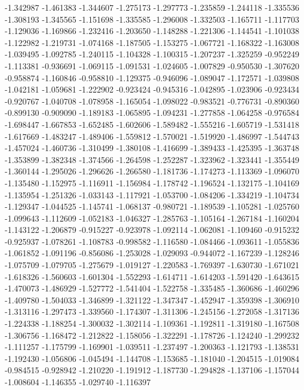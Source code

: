 -1.342987
-1.461383
-1.344607
-1.275173
-1.297773
-1.235859
-1.244118
-1.335536
-1.308193
-1.345565
-1.151698
-1.335585
-1.296008
-1.332503
-1.165711
-1.117703
-1.129036
-1.169866
-1.232416
-1.203650
-1.148288
-1.221306
-1.144541
-1.101038
-1.122982
-1.219731
-1.074168
-1.187505
-1.153275
-1.067721
-1.168322
-1.163008
-1.039495
-1.092785
-1.240115
-1.104328
-1.100315
-1.207237
-1.325259
-0.952249
-1.113381
-0.936691
-1.069115
-1.091531
-1.024605
-1.007829
-0.950530
-1.307620
-0.958874
-1.160846
-0.958810
-1.129375
-0.946096
-1.089047
-1.172571
-1.039808
-1.042181
-1.059681
-1.222902
-0.923424
-0.945316
-1.042895
-1.023906
-0.923434
-0.920767
-1.040708
-1.078958
-1.165054
-1.098022
-0.983521
-0.776731
-0.890360
-0.899130
-0.909090
-1.189183
-1.065895
-1.094231
-1.277858
-1.064258
-0.976584
-1.698447
-1.667853
-1.652485
-1.602606
-1.589482
-1.555216
-1.605719
-1.531418
-1.617669
-1.483247
-1.489406
-1.559812
-1.570021
-1.519920
-1.486997
-1.544743
-1.457024
-1.460736
-1.310499
-1.380108
-1.416699
-1.389433
-1.425395
-1.363748
-1.353899
-1.382348
-1.374566
-1.264598
-1.252287
-1.323962
-1.323441
-1.355449
-1.360144
-1.295026
-1.296626
-1.266580
-1.181736
-1.174273
-1.113369
-1.096070
-1.135480
-1.152975
-1.116911
-1.156984
-1.178742
-1.196524
-1.132175
-1.104169
-1.135954
-1.251326
-1.033143
-1.117921
-1.053700
-1.084206
-1.334219
-1.104734
-1.129347
-1.044525
-1.145741
-1.068137
-0.980721
-1.189539
-1.105281
-1.025760
-1.099643
-1.112609
-1.052183
-1.046327
-1.285763
-1.105164
-1.267184
-1.160204
-1.143122
-1.206879
-0.915227
-0.923978
-1.092114
-1.062081
-1.109460
-0.915232
-0.925937
-1.078261
-1.108783
-0.998582
-1.116580
-1.084466
-1.093611
-1.055836
-1.061852
-1.091196
-0.856086
-1.253028
-1.029093
-0.944072
-1.167239
-1.128246
-1.075709
-1.079705
-1.275679
-1.019127
-1.220583
-1.769397
-1.630730
-1.671021
-1.618326
-1.560603
-1.601304
-1.552293
-1.614711
-1.614203
-1.591420
-1.643615
-1.470073
-1.486929
-1.527772
-1.541404
-1.522758
-1.335485
-1.360686
-1.460296
-1.409780
-1.504033
-1.346899
-1.321122
-1.347347
-1.452947
-1.359398
-1.306910
-1.313116
-1.297473
-1.339560
-1.174307
-1.311306
-1.245156
-1.272058
-1.317136
-1.224338
-1.188254
-1.300032
-1.302114
-1.109361
-1.192811
-1.319180
-1.167508
-1.306756
-1.168472
-1.212822
-1.158056
-1.322291
-1.178726
-1.124240
-1.299232
-1.111257
-1.175799
-1.169901
-1.039511
-1.237497
-1.200363
-1.121793
-1.138531
-1.192430
-1.056806
-1.045494
-1.144708
-1.153685
-1.181040
-1.204515
-1.019084
-0.984515
-0.928942
-1.210220
-1.191912
-1.187730
-1.294828
-1.137106
-1.157044
-1.008604
-1.146355
-1.029740
-1.116397
